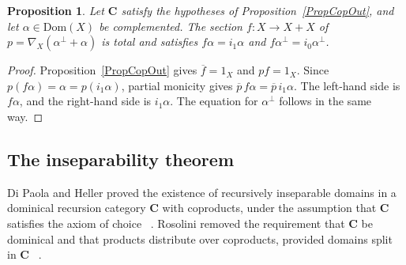 \documentclass[letterpaper,10pt]{amsart}
\theoremstyle{plain}
\newtheorem{prop}{Proposition}[thm]
\theoremstyle{definition}
\newcommand{\rst}[1]{\overline{#1}}
\begin{document}
\begin{prop}\label{PropDichotomy}
Let $\mathbf C$ satisfy the hypotheses of Proposition~\ref{PropCopOut},
and let $\alpha\in\mathrm{Dom}(X)$ be complemented. The section
$f:X\to X+X$ of $p=\nabla_X(\alpha^\perp+\alpha)$ is total and satisfies $f\alpha=i_1\alpha$ and
$f\alpha^\perp=i_0\alpha^\perp$.
\end{prop}
\begin{proof}
Proposition~\ref{PropCopOut} gives $\rst f=1_X$ and $pf=1_X$.
Since $p(f\alpha)=\alpha=p(i_1\alpha)$, partial monicity gives
$\rst p\,f\alpha=\rst p\,i_1\alpha$.
The left-hand side is $f\alpha$, and the right-hand side is
$i_1\alpha$. The equation for $\alpha^\perp$ follows in the same way.
\end{proof}

\subsection{The inseparability theorem}
Di Paola and Heller proved the existence of
recursively inseparable domains in a dominical recursion category
$\mathbf{C}$ with coproducts, under the assumption that $\mathbf{C}$ satisfies the
axiom of choice ~\cite[Theorem 8.15]{MR88i:03078}. Rosolini removed the requirement that $\mathbf{C}$ be dominical and that products distribute over coproducts, 
provided domains split in $\mathbf{C}$ ~\cite{MR90e:18001}.
\end{document}
